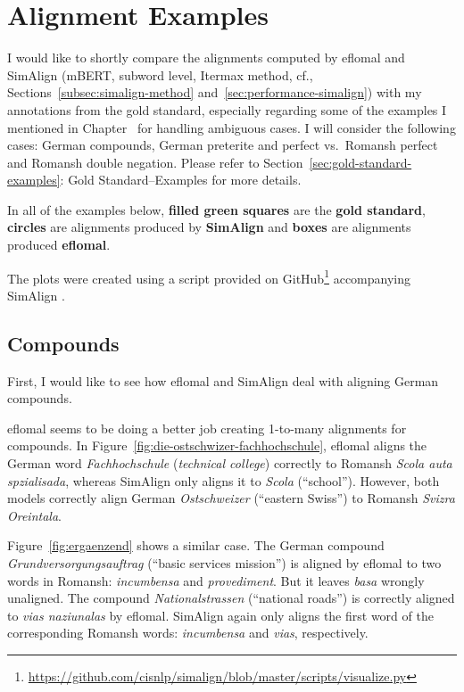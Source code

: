\chapter{Alignment Examples}\label{appendix-a}

I would like to shortly compare the  alignments computed by eflomal and SimAlign (mBERT, subword level, Itermax method, cf., Sections~\ref{subsec:simalign-method} and~\ref{sec:performance-simalign}) with my annotations from the gold standard, especially regarding some of the examples I mentioned in Chapter~ for handling ambiguous cases.
I will consider the following cases: German compounds,  German preterite and perfect vs.~Romansh perfect and Romansh double negation. 
Please refer to Section~\ref{sec:gold-standard-examples}: Gold Standard--Examples for more details.

In all of the examples below, \textbf{filled green squares} are the \textbf{gold standard},\textbf{ circles} are alignments produced by \textbf{SimAlign} and \textbf{boxes} are alignments produced \textbf{eflomal}. 

The plots were created using a script provided on GitHub\footnote{\url{https://github.com/cisnlp/simalign/blob/master/scripts/visualize.py}} accompanying SimAlign \autocite{jalili-sabet-etal-2020-simalign}.

\section{Compounds}
First, I would like to see how eflomal and SimAlign deal with aligning German compounds.

eflomal seems to be doing a better job creating 1-to-many alignments for compounds. 
In Figure~\ref{fig:die-ostschwizer-fachhochschule}, eflomal aligns  the German word \emph{Fachhochschule} (\emph{technical college}) correctly  to Romansh \emph{Scola auta spzialisada}, whereas SimAlign only aligns it to \emph{Scola} (\enquote{school}). 
However, both models correctly align German \emph{Ostschweizer} (\enquote{eastern Swiss}) to Romansh \emph{Svizra Oreintala}.

Figure~\ref{fig:ergaenzend} shows a similar case. The German compound \emph{Grundversorgungsauftrag} (\enquote{basic services mission}) is aligned by eflomal to two words in Romansh: \emph{incumbensa} and \emph{provediment}. But it leaves \emph{basa} wrongly unaligned. 
The compound \emph{Nationalstrassen} (\enquote{national roads}) is correctly aligned to \emph{vias naziunalas} by eflomal. SimAlign again only aligns the first word of the corresponding Romansh words: \emph{incumbensa}  and \emph{vias}, respectively.

